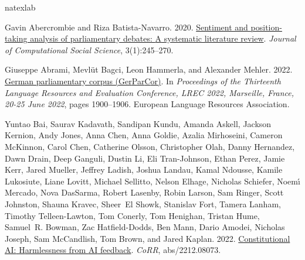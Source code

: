 \documentclass[11pt,a4paper]{article}
\begin{document}
\begin{thebibliography}{26}
  \expandafter\ifx\csname natexlab\endcsname\relax\def\natexlab#1{#1}\fi
  
  Gavin Abercrombie and Riza Batista-Navarro. 2020.
  \newblock \href {https://doi.org/10.1007/s42001-019-00060-w} {Sentiment and
    position-taking analysis of parliamentary debates: {A} systematic literature
    review}.
  \newblock \emph{Journal of Computational Social Science}, 3(1):245--270.
  
  Giuseppe Abrami, Mevl{\"{u}}t Bagci, Leon Hammerla, and Alexander Mehler. 2022.
  \newblock \href {https://aclanthology.org/2022.lrec-1.202} {German
    parliamentary corpus ({G}er{P}ar{C}or)}.
  \newblock In \emph{Proceedings of the Thirteenth Language Resources and
    Evaluation Conference, {LREC} 2022, Marseille, France, 20-25 June 2022},
    pages 1900--1906. European Language Resources Association.
  
  Yuntao Bai, Saurav Kadavath, Sandipan Kundu, Amanda Askell, Jackson Kernion,
    Andy Jones, Anna Chen, Anna Goldie, Azalia Mirhoseini, Cameron McKinnon,
    Carol Chen, Catherine Olsson, Christopher Olah, Danny Hernandez, Dawn Drain,
    Deep Ganguli, Dustin Li, Eli Tran{-}Johnson, Ethan Perez, Jamie Kerr, Jared
    Mueller, Jeffrey Ladish, Joshua Landau, Kamal Ndousse, Kamile Lukosiute,
    Liane Lovitt, Michael Sellitto, Nelson Elhage, Nicholas Schiefer,
    Noem{\'{\i}} Mercado, Nova DasSarma, Robert Lasenby, Robin Larson, Sam
    Ringer, Scott Johnston, Shauna Kravec, Sheer~El Showk, Stanislav Fort, Tamera
    Lanham, Timothy Telleen{-}Lawton, Tom Conerly, Tom Henighan, Tristan Hume,
    Samuel~R. Bowman, Zac Hatfield{-}Dodds, Ben Mann, Dario Amodei, Nicholas
    Joseph, Sam McCandlish, Tom Brown, and Jared Kaplan. 2022.
  \newblock \href {https://doi.org/10.48550/arXiv.2212.08073} {Constitutional
    {AI:} {H}armlessness from {AI} feedback}.
  \newblock \emph{CoRR}, abs/2212.08073.
  

\end{thebibliography}
\end{document}
